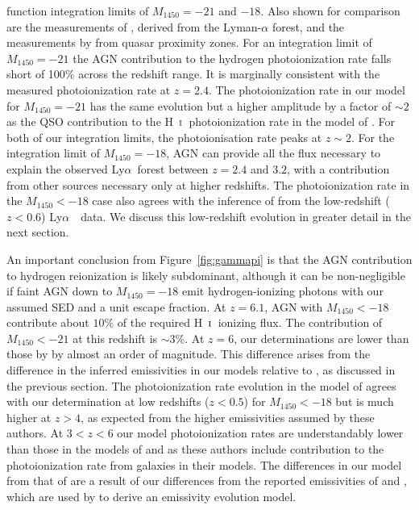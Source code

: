 \documentclass[fleqn,usenatbib]{mnras}
\def\lya{Ly$\alpha$~}
\def\HI{\hbox{H~$\scriptstyle\rm I$}}
\begin{document}
      function integration limits of $M_{1450}=-21$ and $-18$.  Also shown
      for comparison are the measurements of \citet{2013MNRAS.436.1023B},
      derived from the Lyman-$\alpha$ forest, and the measurements by
      \citet{2011MNRAS.412.2543C} from quasar proximity zones.  For an
      integration limit of $M_{1450}=-21$ the AGN contribution to the
      hydrogen photoionization rate falls short of 100\% across the redshift
      range.  It is marginally consistent with the measured photoionization
      rate at $z=2.4$.  The photoionization rate in our model for
      $M_{1450}=-21$ has the same evolution but a higher amplitude by a
      factor of $\sim 2$ as the QSO contribution to the \HI\ photoionization
      rate in the model of \citet{2012ApJ...746..125H}.  For both of our
      integration limits, the photoionisation rate peaks at $z\sim 2$.  For
      the integration limit of $M_{1450}=-18$, AGN can provide all the flux
      necessary to explain the observed \lya forest between $z=2.4$ and
      $3.2$, with a contribution from other sources necessary only at higher
      redshifts.  The photoionization rate in the $M_{1450}<-18$ case also
      agrees with the inference of \citet{2017MNRAS.467.3172G} from the
      low-redshift ($z<0.6$) \lya\ data.  We discuss this low-redshift
      evolution in greater detail in the next section.

      An important conclusion from Figure~\ref{fig:gammapi} is that the AGN
      contribution to hydrogen reionization is likely subdominant, although
      it can be non-negligible if faint AGN down to $M_{1450}=-18$ emit
      hydrogen-ionizing photons with our assumed SED and a unit escape
      fraction.  At $z=6.1$, AGN with $M_{1450}<-18$ contribute about $10\%$
      of the required \HI\ ionizing flux.  The contribution of
      $M_{1450}<-21$ at this redshift is $\sim 3\%$.  At $z=6$, our
      determinations are lower than those by \citet{2015AA...578A..83G} by
      almost an order of magnitude.  This difference arises from the
      difference in the inferred emissivities in our models relative to
      \citet{2015AA...578A..83G}, as discussed in the previous section.  The
      photoionization rate evolution in the model of
      \citet{2015ApJ...813L...8M} agrees with our determination at low
      redshifts ($z<0.5$) for $M_{1450}<-18$ but is much higher at $z>4$, as
      expected from the higher emissivities assumed by these authors.  At
      $3<z<6$ our model photoionization rates are understandably lower than
      those in the models of \citet{2017ApJ...837..106O} and
      \citet{2018arXiv180104931P} as these authors include contribution to
      the photoionization rate from galaxies in their models. The
      differences in our model from that of \citet{2015MNRAS.451L..30K} are
      a result of our differences from the reported emissivities of
      \citet{2009MNRAS.392...19C} and \citet{2013A&A...551A..29P}, which are
      used by \citet{2015MNRAS.451L..30K} to derive an emissivity evolution
      model.
\end{document}
